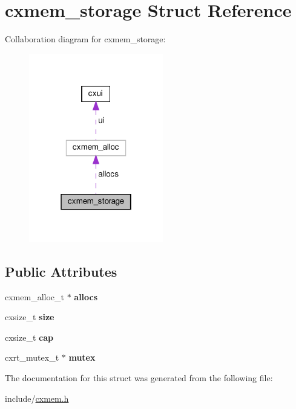 \hypertarget{structcxmem__storage}{}\section{cxmem\+\_\+storage Struct Reference}
\label{structcxmem__storage}


Collaboration diagram for cxmem\+\_\+storage\+:\nopagebreak
\begin{figure}[H]
\begin{center}
\leavevmode
\includegraphics[width=166pt]{structcxmem__storage__coll__graph}
\end{center}
\end{figure}
\subsection*{Public Attributes}
\begin{DoxyCompactItemize}
\item 
\mbox{\label{structcxmem__storage_a4663e63ea74aef2a831c26f29cec7147}} 
cxmem\+\_\+alloc\+\_\+t $\ast$ {\bfseries allocs}
\item 
\mbox{\label{structcxmem__storage_ae0e190eb4581da409bcf0c1709852e9f}} 
cxsize\+\_\+t {\bfseries size}
\item 
\mbox{\label{structcxmem__storage_a631394e8755be3e93cd90beeeb51ff3c}} 
cxsize\+\_\+t {\bfseries cap}
\item 
\mbox{\label{structcxmem__storage_a9c77308d0cf6fc2016ebaaafc77e0402}} 
cxrt\+\_\+mutex\+\_\+t $\ast$ {\bfseries mutex}
\end{DoxyCompactItemize}


The documentation for this struct was generated from the following file\+:\begin{DoxyCompactItemize}
\item 
include/\hyperlink{cxmem_8h}{cxmem.\+h}\end{DoxyCompactItemize}
